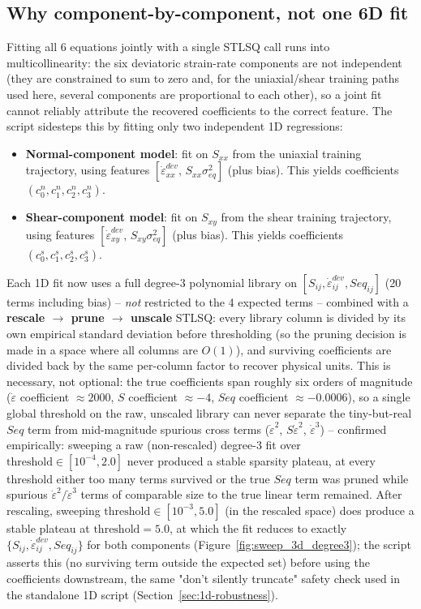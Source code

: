 \documentclass{article}
\begin{document}
\subsection{Why component-by-component, not one 6D fit}
Fitting all 6 equations jointly with a single STLSQ call runs into multicollinearity: the six deviatoric strain-rate components are not independent (they are constrained to sum to zero and, for the uniaxial/shear training paths used here, several components are proportional to each other), so a joint fit cannot reliably attribute the recovered coefficients to the correct feature. The script sidesteps this by fitting only two independent 1D regressions:
\begin{itemize}
    \item \textbf{Normal-component model}: fit on $S_{xx}$ from the uniaxial training trajectory, using features $[\dot{\varepsilon}^{dev}_{xx},\, S_{xx}\sigma_{eq}^2]$ (plus bias). This yields coefficients $(c_0^n, c_1^n, c_2^n, c_3^n)$.
    \item \textbf{Shear-component model}: fit on $S_{xy}$ from the shear training trajectory, using features $[\dot{\varepsilon}^{dev}_{xy},\, S_{xy}\sigma_{eq}^2]$ (plus bias). This yields coefficients $(c_0^s, c_1^s, c_2^s, c_3^s)$.
\end{itemize}
Each 1D fit now uses a full degree-3 polynomial library on $[S_{ij}, \dot\varepsilon^{dev}_{ij}, Seq_{ij}]$ (20 terms including bias) -- \emph{not} restricted to the 4 expected terms -- combined with a \textbf{rescale $\to$ prune $\to$ unscale} STLSQ: every library column is divided by its own empirical standard deviation before thresholding (so the pruning decision is made in a space where all columns are $O(1)$), and surviving coefficients are divided back by the same per-column factor to recover physical units. This is necessary, not optional: the true coefficients span roughly six orders of magnitude ($\dot\varepsilon$ coefficient $\approx 2000$, $S$ coefficient $\approx -4$, $Seq$ coefficient $\approx -0.0006$), so a single global threshold on the raw, unscaled library can never separate the tiny-but-real $Seq$ term from mid-magnitude spurious cross terms ($\dot\varepsilon^2$, $S\dot\varepsilon^2$, $\dot\varepsilon^3$) -- confirmed empirically: sweeping a raw (non-rescaled) degree-3 fit over $\text{threshold}\in[10^{-4},2.0]$ never produced a stable sparsity plateau, at every threshold either too many terms survived or the true $Seq$ term was pruned while spurious $\dot\varepsilon^2/\dot\varepsilon^3$ terms of comparable size to the true linear term remained. After rescaling, sweeping $\text{threshold}\in[10^{-3},5.0]$ (in the rescaled space) does produce a stable plateau at $\text{threshold}=5.0$, at which the fit reduces to exactly $\{S_{ij}, \dot\varepsilon^{dev}_{ij}, Seq_{ij}\}$ for both components (Figure~\ref{fig:sweep_3d_degree3}); the script asserts this (no surviving term outside the expected set) before using the coefficients downstream, the same "don't silently truncate" safety check used in the standalone 1D script (Section~\ref{sec:1d-robustness}).
\end{document}
